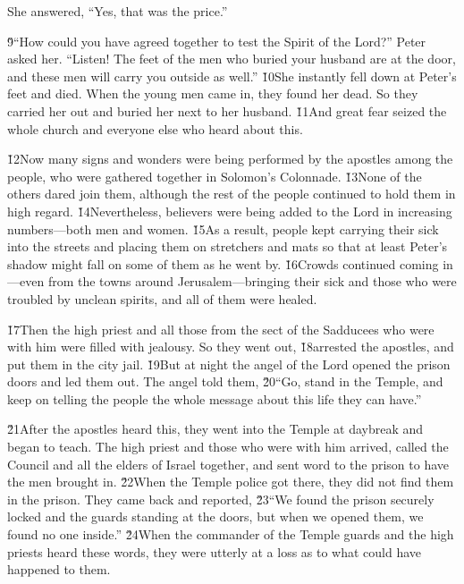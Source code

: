 She answered, ``Yes, that was the price.''

\v{9}``How could you have agreed together to test the Spirit of the Lord?'' Peter asked her. ``Listen! The feet of the men who buried your husband are at the door, and these men will carry you outside as well.'' \v{10}She instantly fell down at Peter's feet and died. When the young men came in, they found her dead. So they carried her out and buried her next to her husband. \v{11}And great fear seized the whole church and everyone else who heard about this.

\v{12}Now many signs and wonders were being performed by the apostles among the people, who were gathered together in Solomon's Colonnade. \v{13}None of the others dared join them, although the rest of the people continued to hold them in high regard. \v{14}Nevertheless, believers were being added to the Lord in increasing numbers---both men and women. \v{15}As a result, people kept carrying their sick into the streets and placing them on stretchers and mats so that at least Peter's shadow might fall on some of them as he went by. \v{16}Crowds continued coming in---even from the towns around Jerusalem---bringing their sick and those who were troubled by unclean spirits, and all of them were healed.

\v{17}Then the high priest and all those from the sect of the Sadducees who were with him were filled with jealousy. So they went out, \v{18}arrested the apostles, and put them in the city jail. \v{19}But at night the angel of the Lord opened the prison doors and led them out. The angel told them, \v{20}``Go, stand in the Temple, and keep on telling the people the whole message about this life they can have.''

\v{21}After the apostles heard this, they went into the Temple at daybreak and began to teach. The high priest and those who were with him arrived, called the Council and all the elders of Israel together, and sent word to the prison to have the men brought in. \v{22}When the Temple police got there, they did not find them in the prison. They came back and reported, \v{23}``We found the prison securely locked and the guards standing at the doors, but when we opened them, we found no one inside.'' \v{24}When the commander of the Temple guards and the high priests heard these words, they were utterly at a loss as to what could have happened to them.

